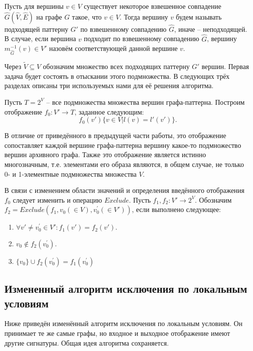 Пусть для вершины $v \in V$ существует некоторое взвешенное совпадение  $\widehat{G}(\widehat{V}, \widehat{E})$ на графе $G$ такое, что $v \in \widehat{V}$. Тогда вершину $v$ будем называть подходящей паттерну $G'$ по взвешенному совпадению $\widehat{G}$, иначе -- неподходящей. В случае, если вершина $v$ подходит по взвешенному совпадению $\widehat{G}$, вершину $m_{\widehat{G}}^{-1}(v) \in  V'$ назовём соответствующей данной вершине $v$.

Через $\widetilde{V} \subseteq V$ обозначим множество всех подходящих паттерну $G'$ вершин. Первая задача будет состоять в отыскании этого подмножества. В следующих трёх разделах описаны три используемых нами для её решения алгоритма.

Пусть $T = 2^{V}$ -- все подмножества множества вершин графа-паттерна. Построим отображение $f_0 : V' \to T$, заданное следующим:
\begin{equation}
f_0(v') \{v \in V | l(v) = l'(v')\} .
\end{equation}

В отличие от приведённого в предыдущей части работы, это отображение сопоставляет каждой вершине графа-паттерна вершину какое-то подмножество вершин архивного графа. Также это отображение является истинно многозначным, т.е. элементами его образа являются, в общем случае, не только 0- и 1-элементные подмножества множества $V$. 

В связи с изменением области значений и определения введённого отображения $f_0$ следует изменить и операцию $Exclude$. Пусть $f_1, f_2 : V' \to 2^{V}$. Обозначим $f_2 = Exclude(f_1, v_0 (\in V), v^{\prime}_0 (\in V'))$, если выполнено следующее:
\begin{enumerate}
	\item $\forall v' \ne v^{\prime}_0 \in V': f_1(v') = f_2(v')$.
	\item $v_0 \notin f_2(v^{\prime}_0)$.
	\item $\{v_0\} \cup f_2(v^{\prime}_0) = f_1(v^{\prime}_0)$
\end{enumerate}

\subsection{Измененный алгоритм исключения по локальным условиям}

Ниже приведён изменённый алгоритм исключения по локальным условиям. Он принимает те же самые графы, но входное и выходное отображение имеют другие сигнатуры. Общая идея алгоритма сохраняется.

